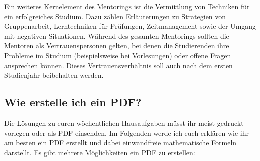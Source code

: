 Ein weiteres Kernelement des Mentorings 
ist die Vermittlung von Techniken für ein erfolgreiches Studium. 
Dazu zählen Erläuterungen zu Strategien von Gruppenarbeit, 
Lerntechniken für Prüfungen, Zeitmanagement sowie der Umgang 
mit negativen Situationen. 
Während des gesamten Mentorings sollten die Mentoren 
als Vertrauenspersonen gelten, bei denen die Studierenden 
ihre Probleme im Studium (beispielsweise bei Vorlesungen) 
oder offene Fragen ansprechen können. 
Dieses Vertrauensverhältnis soll auch nach dem ersten Studienjahr 
beibehalten werden.

\subsection{Wie erstelle ich ein PDF?}

Die Lösungen zu euren wöchentlichen Hausaufgaben müsst ihr meist gedruckt vorlegen oder als PDF einsenden.
Im Folgenden werde ich euch erklären wie ihr am besten ein PDF erstellt und dabei einwandfreie mathematische Formeln darstellt.
Es gibt mehrere Möglichkeiten ein PDF zu erstellen:

